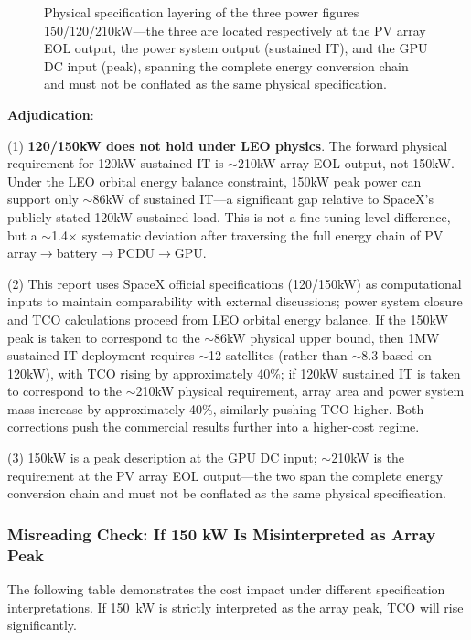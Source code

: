 \begin{figure}[H]
\centering

\caption{Physical specification layering of the three power figures 150/120/210\;kW---the three are located respectively at the PV array EOL output, the power system output (sustained IT), and the GPU DC input (peak), spanning the complete energy conversion chain and must not be conflated as the same physical specification.}
\label{fig:power_chain}
\end{figure}

\medskip

\textbf{Adjudication}:

(1) \textbf{120/150\;kW does not hold under LEO physics}. The forward physical requirement for 120\;kW sustained IT is $\sim$210\;kW array EOL output, not 150\;kW. Under the LEO orbital energy balance constraint, 150\;kW peak power can support only $\sim$86\;kW of sustained IT---a significant gap relative to SpaceX's publicly stated 120\;kW sustained load. This is not a fine-tuning-level difference, but a $\sim$1.4$\times$ systematic deviation after traversing the full energy chain of PV array$\to$battery$\to$PCDU$\to$GPU.

(2) This report uses SpaceX official specifications (120/150\;kW) as computational inputs to maintain comparability with external discussions; power system closure and TCO calculations proceed from LEO orbital energy balance. If the 150\;kW peak is taken to correspond to the $\sim$86\;kW physical upper bound, then 1\;MW sustained IT deployment requires $\sim$12 satellites (rather than $\sim$8.3 based on 120\;kW), with TCO rising by approximately 40\%; if 120\;kW sustained IT is taken to correspond to the $\sim$210\;kW physical requirement, array area and power system mass increase by approximately 40\%, similarly pushing TCO higher. Both corrections push the commercial results further into a higher-cost regime.

(3) 150\;kW is a peak description at the GPU DC input; $\sim$210\;kW is the requirement at the PV array EOL output---the two span the complete energy conversion chain and must not be conflated as the same physical specification.

\subsubsection{Misreading Check: If 150 kW Is Misinterpreted as Array Peak}

The following table demonstrates the cost impact under different specification interpretations. If 150~kW is strictly interpreted as the array peak, TCO will rise significantly.

